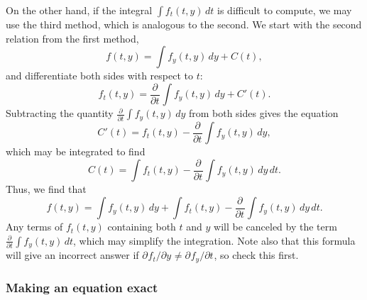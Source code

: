 \documentclass{myart}
\newcommand{\pderiv}[3][]{\frac{\partial^{#1}#2}{\partial#3^{#1}}}
\newcommand{\fpderiv}[3][]{\partial^{#1}#2/\partial#3^{#1}}
\begin{document}
On the other hand, if the integral $\int f_t(t, y) \,dt$ is difficult
to compute, we may use the third method, which is analogous to the
second. We start with the second relation from the first method,
\begin{equation*}
  f(t, y) = \int f_y(t, y) \,dy + C(t),
\end{equation*}
and differentiate both sides with respect to $t$:
\begin{equation*}
  f_t(t, y) = \pderiv{}{t} \int f_y(t, y) \,dy + C'(t).
\end{equation*}
Subtracting the quantity $\pderiv{}{t} \int f_y(t, y) \,dy$ from both
sides gives the equation
\begin{equation*}
  C'(t) = f_t(t, y) - \pderiv{}{t} \int f_y(t, y) \,dy,
\end{equation*}
which may be integrated to find
\begin{equation*}
  C(t) = \int f_t(t, y) - \pderiv{}{t} \int f_y(t, y) \,dy \,dt.
\end{equation*}
Thus, we find that
\begin{equation*}
  f(t, y) = \int f_y(t, y) \,dy
          + \int f_t(t, y) - \pderiv{}{t} \int f_y(t, y) \,dy \,dt.
\end{equation*}
Any terms of $f_t(t, y)$ containing both $t$ and $y$ will be canceled
by the term $\pderiv{}{t} \int f_y(t, y) \,dt$, which may simplify the
integration. Note also that this formula will give an incorrect answer
if $\fpderiv{f_t}{y} \neq \fpderiv{f_y}{t}$, so check this first.

\subsubsection{Making an equation exact}
\label{subsubsec:making an equation exact}
\end{document}
